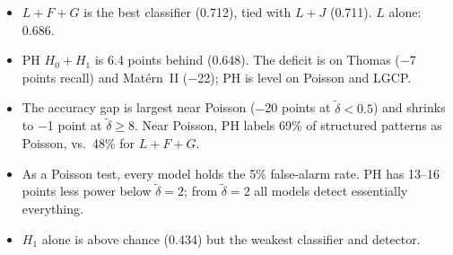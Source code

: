 \documentclass[10pt,a4paper]{article}
\newcommand{\dtil}{\tilde\delta}
\begin{document}
\begin{itemize}
  \item $L{+}F{+}G$ is the best classifier (0.712), tied with $L{+}J$ (0.711). $L$ alone: 0.686.
  \item PH $H_0{+}H_1$ is 6.4 points behind (0.648). The deficit is on Thomas ($-$7 points recall) and Mat\'ern~II ($-$22); PH is level on Poisson and LGCP.
  \item The accuracy gap is largest near Poisson ($-$20 points at $\dtil < 0.5$) and shrinks to $-$1 point at $\dtil \ge 8$. Near Poisson, PH labels 69\% of structured patterns as Poisson, vs.\ 48\% for $L{+}F{+}G$.
  \item As a Poisson test, every model holds the 5\% false-alarm rate. PH has 13--16 points less power below $\dtil = 2$; from $\dtil = 2$ all models detect essentially everything.
  \item $H_1$ alone is above chance (0.434) but the weakest classifier and detector.
\end{itemize}
\end{document}
